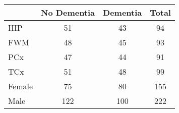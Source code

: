 \begin{table}[ht]
\centering
\begin{tabular}{l|cc|c}
  \hline
 & No Dementia & Dementia & Total \\ 
  \hline
HIP & 51 & 43 & 94 \\ 
  FWM & 48 & 45 & 93 \\ 
  PCx & 47 & 44 & 91 \\ 
  TCx & 51 & 48 & 99 \\ 
  Female & 75 & 80 & 155 \\ 
  Male & 122 & 100 & 222 \\ 
   \hline
\end{tabular}
\end{table}
